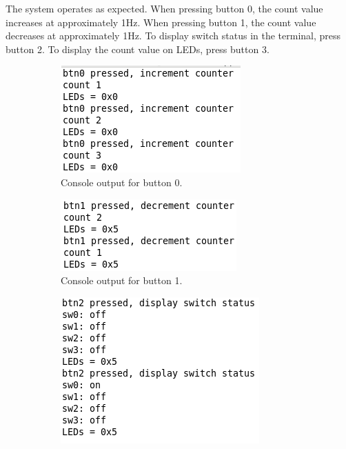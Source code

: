 \documentclass[11pt,letterpaper,titlepage]{article}
\begin{document}
The system operates as expected. When pressing button 0, the count value increases at approximately 1Hz. When pressing button 1, the count value decreases at approximately 1Hz. To display switch status in the terminal, press button 2. To display the count value on LEDs, press button 3.

\begin{figure}[ht]
\centering
    \begin{subfigure}[]{0.45\textwidth}
        \includegraphics[width=\linewidth]{Btn0.png} 
        \caption{Console output for button 0.}
    \end{subfigure}
    \begin{subfigure}[]{0.45\textwidth}
        \includegraphics[width=\linewidth]{Btn1.png}
        \caption{Console output for button 1.}
    \end{subfigure}
    \begin{subfigure}[]{0.45\textwidth}
        \includegraphics[width=\linewidth]{Btn2.png} 

\end{subfigure}
\end{figure}
\end{document}
